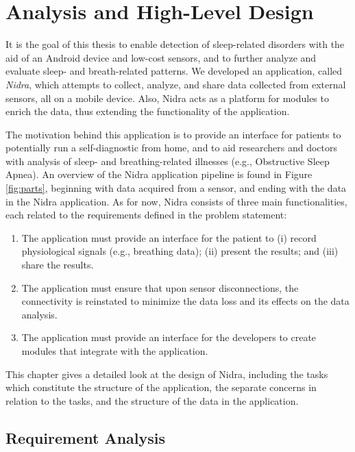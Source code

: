 
\chapter{Analysis and High-Level Design}

It is the goal of this thesis to enable detection of sleep-related disorders with the aid of an Android device and low-cost sensors, and to further analyze and evaluate sleep- and breath-related patterns. We developed an application, called \textit{Nidra}, which attempts to collect, analyze, and share data collected from external sensors, all on a mobile device. Also, Nidra acts as a platform for modules to enrich the data, thus extending the functionality of the application.

The motivation behind this application is to provide an interface for patients to potentially run a self-diagnostic from home, and to aid researchers and doctors with analysis of sleep- and breathing-related illnesses (e.g., Obstructive Sleep Apnea). An overview of the Nidra application pipeline is found in Figure \ref{fig:parts}, beginning with data acquired from a sensor, and ending with the data in the Nidra application. As for now, Nidra consists of three main functionalities, each related to the requirements defined in the problem statement: 

\begin{enumerate}
    \item The application must provide an interface for the patient to (i) record physiological signals (e.g., breathing data); (ii) present the results; and (iii) share the results.
    \item The application must ensure that upon sensor disconnections, the connectivity is reinstated to minimize the data loss and its effects on the data analysis.
    \item The application must provide an interface for the developers to create modules that integrate with the application.
\end{enumerate}

This chapter gives a detailed look at the design of Nidra, including the tasks which constitute the structure of the application, the separate concerns in relation to the tasks, and the structure of the data in the application.

\section{Requirement Analysis}

